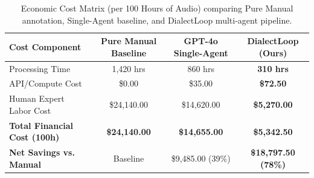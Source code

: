 
\begin{table}[h]
\centering
\small
\begin{tabular}{lccc}
\toprule
\textbf{Cost Component} & \textbf{Pure Manual Baseline} & \textbf{GPT-4o Single-Agent} & \textbf{DialectLoop (Ours)} \\
\midrule
Processing Time & 1,420 hrs & 860 hrs & \textbf{310 hrs} \\
API/Compute Cost & \$0.00 & \$35.00 & \textbf{\$72.50} \\
Human Expert Labor Cost & \$24,140.00 & \$14,620.00 & \textbf{\$5,270.00} \\
\midrule
\textbf{Total Financial Cost (100h)} & \textbf{\$24,140.00} & \textbf{\$14,655.00} & \textbf{\$5,342.50} \\
\textbf{Net Savings vs. Manual} & Baseline & \$9,485.00 (39\%) & \textbf{\$18,797.50 (78\%)} \\
\bottomrule
\end{tabular}
\caption{Economic Cost Matrix (per 100 Hours of Audio) comparing Pure Manual annotation, Single-Agent baseline, and DialectLoop multi-agent pipeline.}
\label{tab:cost_matrix}
\end{table}
